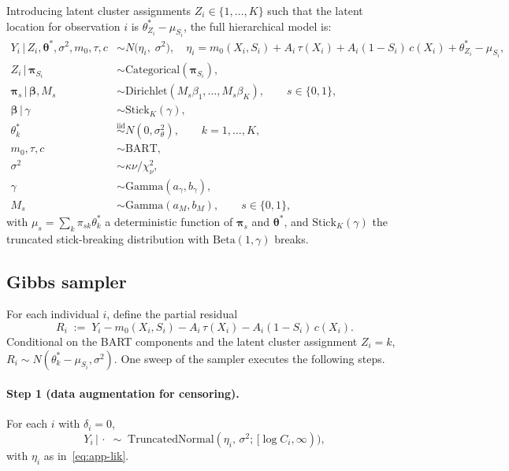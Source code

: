 \documentclass[11pt]{article}
\theoremstyle{plain}
\theoremstyle{definition}
\theoremstyle{remark}
\newcommand{\1}{\mathds{1}}
\newcommand{\given}{\,|\,}
\begin{document}
Introducing latent cluster assignments $Z_i \in \{1, \ldots, K\}$ such that the latent location for observation $i$ is $\theta_{Z_i}^* - \mu_{S_i}$, the full hierarchical model is:
\begin{align}
Y_i \given Z_i, \bm{\theta}^*, \sigma^2, m_0, \tau, c &\sim N\!\big(\eta_i,\; \sigma^2\big), \quad \eta_i = m_0(X_i, S_i) + A_i\, \tau(X_i) + A_i(1 - S_i)\, c(X_i) + \theta_{Z_i}^* - \mu_{S_i}, \label{eq:app-lik} \\
Z_i \given \bm{\pi}_{S_i} &\sim \mathrm{Categorical}(\bm{\pi}_{S_i}), \\
\bm{\pi}_s \given \bm{\beta}, M_s &\sim \mathrm{Dirichlet}(M_s \beta_1, \ldots, M_s \beta_K), \qquad s \in \{0, 1\}, \\
\bm{\beta} \given \gamma &\sim \mathrm{Stick}_K(\gamma), \\
\theta_k^* &\stackrel{\mathrm{iid}}{\sim} N(0, \sigma_\theta^2), \qquad k = 1, \ldots, K, \\
m_0, \tau, c &\sim \mathrm{BART}, \\
\sigma^2 &\sim \kappa\nu / \chi^2_\nu, \\
\gamma &\sim \mathrm{Gamma}(a_\gamma, b_\gamma), \\
M_s &\sim \mathrm{Gamma}(a_M, b_M), \qquad s \in \{0, 1\},
\end{align}
with $\mu_s = \sum_k \pi_{sk} \theta_k^*$ a deterministic function of $\bm{\pi}_s$ and $\bm{\theta}^*$, and $\mathrm{Stick}_K(\gamma)$ the truncated stick-breaking distribution with $\mathrm{Beta}(1, \gamma)$ breaks.

\subsection{Gibbs sampler}
\label{app:hdp-gibbs}

For each individual $i$, define the partial residual
\begin{equation}
R_i \;:=\; Y_i - m_0(X_i, S_i) - A_i\, \tau(X_i) - A_i(1 - S_i)\, c(X_i).
\label{eq:app-Ri}
\end{equation}
Conditional on the BART components and the latent cluster assignment $Z_i = k$, $R_i \sim N(\theta_k^* - \mu_{S_i}, \sigma^2)$. One sweep of the sampler executes the following steps.

\paragraph{Step 1 (data augmentation for censoring).} For each $i$ with $\delta_i = 0$,
\begin{equation}
Y_i \given \cdot \;\sim\; \mathrm{TruncatedNormal}(\eta_i,\, \sigma^2;\, [\log C_i, \infty)),
\end{equation}
with $\eta_i$ as in~\eqref{eq:app-lik}.
\end{document}
